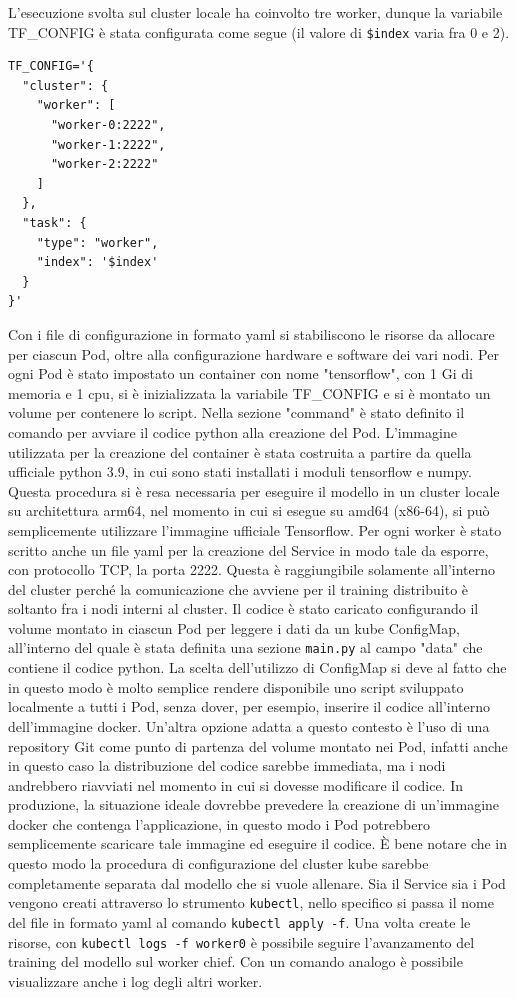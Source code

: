 \documentclass[12pt,a4paper,fleqn,titlepage]{report}
\begin{document}
        L'esecuzione svolta sul \gls{cluster} locale ha coinvolto tre worker, dunque la variabile TF\_CONFIG è stata configurata come segue (il valore di \lstinline{$index} varia fra 0 e 2).
        \begin{lstlisting}[numbers=none]
TF_CONFIG='{
  "cluster": {
    "worker": [
      "worker-0:2222",
      "worker-1:2222",
      "worker-2:2222"
    ]
  },
  "task": {
    "type": "worker",
    "index": '$index'
  }
}'
        \end{lstlisting}
        Con i file di configurazione in formato \gls{yaml} si stabiliscono le risorse da allocare per ciascun Pod, oltre alla configurazione hardware e software dei vari nodi. Per ogni Pod è stato impostato un \gls{container} con nome "tensorflow", con 1 Gi di memoria e 1 \gls{cpu}, si è inizializzata la variabile TF\_CONFIG e si è montato un volume per contenere lo script. Nella sezione "command" è stato definito il comando per avviare il codice python alla creazione del Pod.
        L'immagine utilizzata per la creazione del \gls{container} è stata costruita a partire da quella ufficiale python 3.9, in cui sono stati installati i moduli tensorflow e numpy. Questa procedura si è resa necessaria per eseguire il modello in un \gls{cluster} locale su architettura arm64, nel momento in cui si esegue su amd64 (x86-64), si può semplicemente utilizzare l'immagine ufficiale Tensorflow.
        Per ogni worker è stato scritto anche un file \gls{yaml} per la creazione del Service in modo tale da esporre, con protocollo TCP, la porta 2222. Questa è raggiungibile solamente all'interno del \gls{cluster} perché la comunicazione che avviene per il training distribuito è soltanto fra i nodi interni al \gls{cluster}.
        Il codice è stato caricato configurando il volume montato in ciascun Pod per leggere i dati da un \gls{kube} ConfigMap, all'interno del quale è stata definita una sezione \lstinline{main.py} al campo "data" che contiene il codice python. La scelta dell'utilizzo di ConfigMap si deve al fatto che in questo modo è molto semplice rendere disponibile uno script sviluppato localmente a tutti i Pod, senza dover, per esempio, inserire il codice all'interno dell'immagine \gls{docker}. Un'altra opzione adatta a questo contesto è l'uso di una repository Git come punto di partenza del volume montato nei Pod, infatti anche in questo caso la distribuzione del codice sarebbe immediata, ma i nodi andrebbero riavviati nel momento in cui si dovesse modificare il codice.
        In produzione, la situazione ideale dovrebbe prevedere la creazione di un'immagine \gls{docker} che contenga l'applicazione, in questo modo i Pod potrebbero semplicemente scaricare tale immagine ed eseguire il codice. È bene notare che in questo modo la procedura di configurazione del \gls{cluster} \gls{kube} sarebbe completamente separata dal modello che si vuole allenare.
        Sia il Service sia i Pod vengono creati attraverso lo strumento \lstinline{kubectl}, nello specifico si passa il nome del file in formato \gls{yaml} al comando \lstinline{kubectl apply -f}. Una volta create le risorse, con \lstinline{kubectl logs -f worker0} è possibile seguire l'avanzamento del training del modello sul worker chief. Con un comando analogo è possibile visualizzare anche i log degli altri worker.
\end{document}
